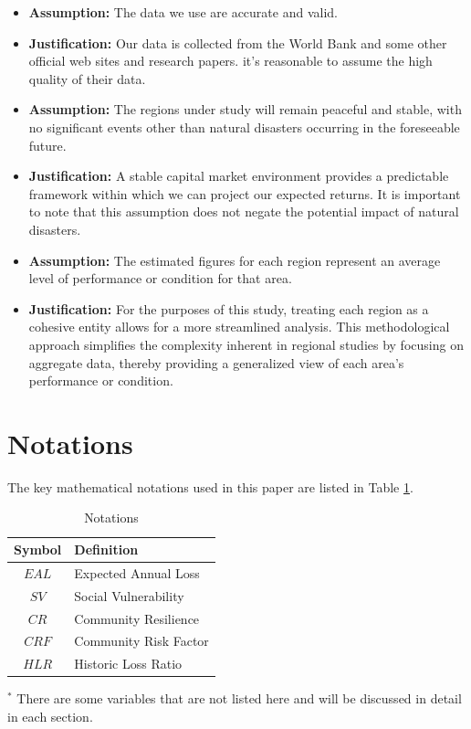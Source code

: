 \documentclass{mcmthesis}
\begin{document}
\begin{itemize}
\item {\bf Assumption:} The data we use are accurate and valid.
\item {\bf Justification:} Our data is collected from the World Bank and some other official web
sites and research papers. it’s reasonable to assume the high quality of their data.
\item {\bf Assumption:} The regions under study will remain peaceful and stable, with no significant
events other than natural disasters occurring in the foreseeable future.
\item {\bf Justification:} A stable capital market environment provides a predictable framework
within which we can project our expected returns. It is important to note that this assumption
does not negate the potential impact of natural disasters.
\item {\bf Assumption:} The estimated figures for each region represent an average level of performance
or condition for that area.
\item {\bf Justification:} For the purposes of this study, treating each region as a cohesive entity
allows for a more streamlined analysis. This methodological approach simplifies the
complexity inherent in regional studies by focusing on aggregate data, thereby providing
a generalized view of each area's performance or condition.
\end{itemize}

\section{Notations}

The key mathematical notations used in this paper are listed in Table \ref{tbl1}. 

\begin{table}[H]     %
\small
\centering           %
\caption{Notations}  %
\label{tbl1}         %
\begin{tabular}{cl}  %
\toprule             %
{\bf Symbol}    &  {\bf Definition}     \\
\midrule             %
$EAL$  & Expected Annual Loss  \\
$SV$   & Social Vulnerability  \\
$CR$   & Community Resilience  \\
$CRF$  & Community Risk Factor \\
$HLR$  & Historic Loss Ratio   \\
\bottomrule         %
\end{tabular}
\vspace{2pt} %
\begin{flushleft} \small
$^{*}$ There are some variables that are not listed here and will be discussed in detail in each
section.
\end{flushleft}
\end{table}
\end{document}
